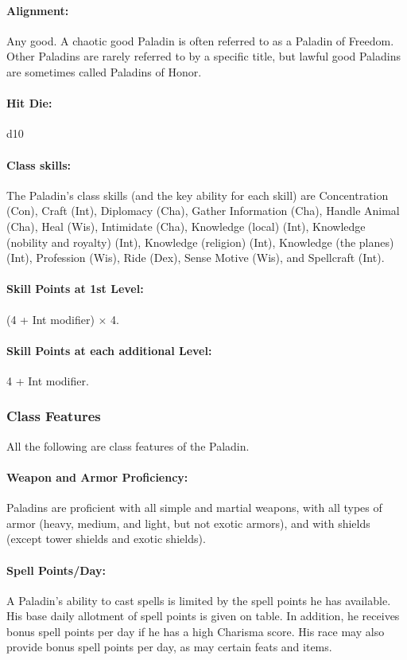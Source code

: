 \paragraph{Alignment:} Any good. A chaotic good Paladin is often referred to as a Paladin of Freedom. Other Paladins are rarely referred to by a specific title, but lawful good Paladins are sometimes called Paladins of Honor.
\paragraph{Hit Die:} d10
\paragraph{Class skills:}
The Paladin's class skills (and the key ability for each skill) are Concentration (Con), Craft (Int), Diplomacy (Cha), Gather Information (Cha), Handle Animal (Cha), Heal (Wis), Intimidate (Cha), Knowledge (local) (Int), Knowledge (nobility and royalty) (Int), Knowledge (religion) (Int), Knowledge (the planes) (Int), Profession (Wis), Ride (Dex), Sense Motive (Wis), and Spellcraft (Int).

\paragraph{Skill Points at 1st Level:} (4 + Int modifier) $\times$ 4.
\paragraph{Skill Points at each additional Level:} 4 + Int modifier.

\subsubsection{Class Features}
All the following are class features of the Paladin.

\paragraph{Weapon and Armor Proficiency:} 
Paladins are proficient with all simple and martial weapons, 
with all types of armor (heavy, medium, and light, but not exotic armors),
and with shields (except tower shields and exotic shields).

\paragraph{Spell Points/Day:} A Paladin's ability to cast spells is limited by the spell points he has available. 
His base daily allotment of spell points is given on  table. 
In addition, he receives bonus spell points per day if he has a high Charisma score.
His race may also provide bonus spell points per day, as may certain feats and items.

